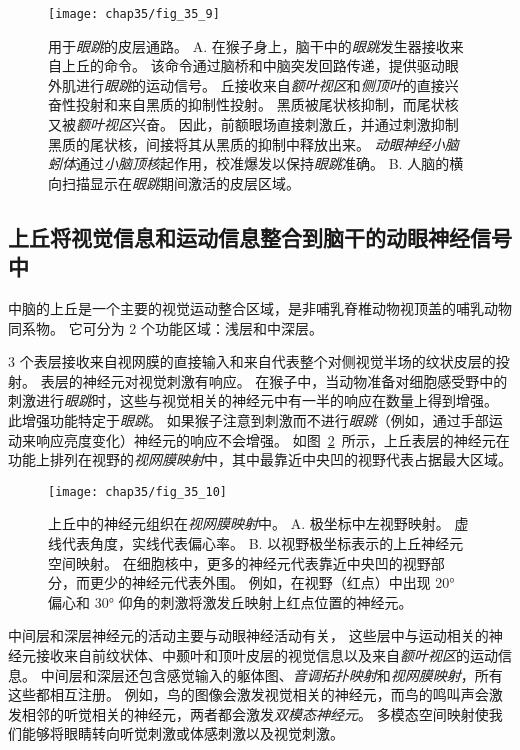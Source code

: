 \begin{figure}[htbp]
	\centering
	\texttt{[image: chap35/fig\_35\_9]}
	\caption{用于\textit{眼跳}的皮层通路。
		A. 在猴子身上，脑干中的\textit{眼跳}发生器接收来自上丘的命令。
		该命令通过脑桥和中脑突发回路传递，提供驱动眼外肌进行\textit{眼跳}的运动信号。
		丘接收来自\textit{额叶视区}和\textit{侧顶叶}的直接兴奋性投射和来自黑质的抑制性投射。
		黑质被尾状核抑制，而尾状核又被\textit{额叶视区}兴奋。
		因此，前额眼场直接刺激丘，并通过刺激抑制黑质的尾状核，间接将其从黑质的抑制中释放出来。
		\textit{动眼神经小脑蚓体}通过\textit{小脑顶核}起作用，校准爆发以保持\textit{眼跳}准确。
		B. 人脑的横向扫描显示在\textit{眼跳}期间激活的皮层区域\cite{curtis2008saccade}。}
	\label{fig:35_9}
\end{figure}



\subsection{上丘将视觉信息和运动信息整合到脑干的动眼神经信号中}

中脑的上丘是一个主要的视觉运动整合区域，是非哺乳脊椎动物视顶盖的哺乳动物同系物。
它可分为 2 个功能区域：浅层和中深层。


3 个表层接收来自视网膜的直接输入和来自代表整个对侧视觉半场的纹状皮层的投射。
表层的神经元对视觉刺激有响应。
在猴子中，当动物准备对细胞感受野中的刺激进行\textit{眼跳}时，这些与视觉相关的神经元中有一半的响应在数量上得到增强。
此增强功能特定于\textit{眼跳}。
如果猴子注意到刺激而不进行\textit{眼跳}（例如，通过手部运动来响应亮度变化）神经元的响应不会增强。
如图~\ref{fig:35_10}~所示，上丘表层的神经元在功能上排列在视野的\textit{视网膜映射}中，其中最靠近中央凹的视野代表占据最大区域。


\begin{figure}[htbp]
	\centering
	\texttt{[image: chap35/fig\_35\_10]}
	\caption{上丘中的神经元组织在\textit{视网膜映射}中。
		A. 极坐标中左视野映射。
		虚线代表角度，实线代表偏心率。
		B. 以视野极坐标表示的上丘神经元空间映射。
		在细胞核中，更多的神经元代表靠近中央凹的视野部分，而更少的神经元代表外围。
		例如，在视野（红点）中出现 20° 偏心和 30° 仰角的刺激将激发丘映射上红点位置的神经元\cite{aizawa1998reversible}。}
	\label{fig:35_10}
\end{figure}


中间层和深层神经元的活动主要与动眼神经活动有关，
这些层中与运动相关的神经元接收来自前纹状体、中颞叶和顶叶皮层的视觉信息以及来自\textit{额叶视区}的运动信息。
中间层和深层还包含感觉输入的躯体图、\textit{音调拓扑映射}和\textit{视网膜映射}，所有这些都相互注册。
例如，鸟的图像会激发视觉相关的神经元，而鸟的鸣叫声会激发相邻的听觉相关的神经元，两者都会激发\textit{双模态神经元}。
多模态空间映射使我们能够将眼睛转向听觉刺激或体感刺激以及视觉刺激。


